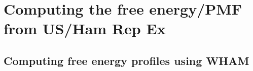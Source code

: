 \documentclass[9pt]{livecoms}
\begin{document}
\section{Computing the free energy/PMF from US/Ham Rep Ex}


\subsection{Computing free energy profiles using WHAM}
 

%
\end{document}
